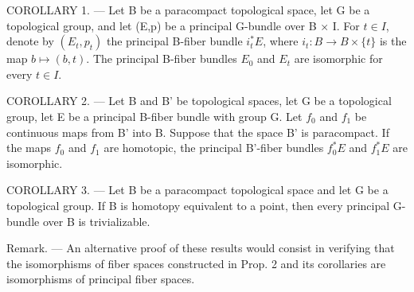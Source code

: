 COROLLARY 1. --- Let B be a paracompact topological space, let G be a topological group, and let (E,p) be a principal G-bundle over B × I. For \(t \in I\), denote by \((E_{t}, p_{t})\) the principal B-fiber bundle \(i_{t}^{*}E\), where \(i_{t}: B \to B \times \{t\}\) is the map \(b \mapsto (b, t)\). The principal B-fiber bundles \(E_{0}\) and \(E_{t}\) are isomorphic for every \(t \in I\).

COROLLARY 2. --- Let B and B' be topological spaces, let G be a topological group, let E be a principal B-fiber bundle with group G. Let \(f_0\) and \(f_1\) be continuous maps from B' into B. Suppose that the space B' is paracompact. If the maps \(f_0\) and \(f_1\) are homotopic, the principal B'-fiber bundles \(f_0^*E\) and \(f_1^*E\) are isomorphic.

COROLLARY 3. --- Let B be a paracompact topological space and let G be a topological group. If B is homotopy equivalent to a point, then every principal G-bundle over B is trivializable.

Remark. --- An alternative proof of these results would consist in verifying that the isomorphisms of fiber spaces constructed in Prop. 2 and its corollaries are isomorphisms of principal fiber spaces.

